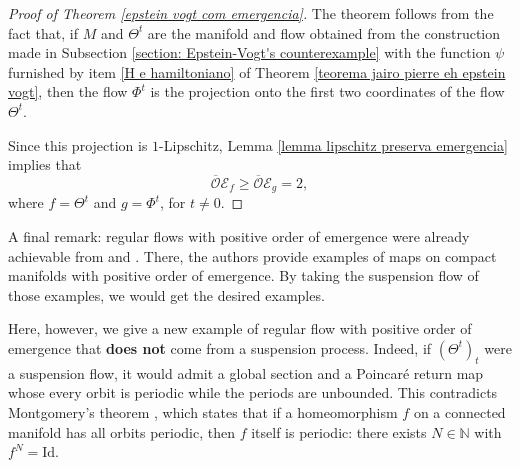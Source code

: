 \documentclass[11pt,reqno]{amsart}
\theoremstyle{plain}
\theoremstyle{definition}
\theoremstyle{remark}
\theoremstyle{plain}
\numberwithin{equation}{section}
\newcommand{\N}{\mathbb{N}}
\begin{document}
					
					\begin{proof}[Proof of Theorem \ref{epstein vogt com emergencia}]
						The theorem follows from the fact that, if $M$ and $\Theta^{t}$ are the manifold and flow obtained from the construction made in Subsection \ref{section: Epstein-Vogt's counterexample} with the function $\psi$ furnished by item \ref{H e hamiltoniano} of Theorem \ref{teorema jairo pierre eh epstein vogt}, then the flow $\Phi^{t}$ is the projection onto the first two coordinates of the flow $\Theta^{t}$. 
						
						Since this projection is $1$-Lipschitz, Lemma \ref{lemma lipschitz preserva emergencia} implies that $$\overline{\mathcal{O}}\mathcal{E}_{f}\geq \overline{\mathcal{O}}\mathcal{E}_{g}=2,$$ where $f=\Theta^{t}$ and $g=\Phi^{t}$, for $t\neq 0$.
					\end{proof}
					
					A final remark: regular flows with positive order of emergence were already achievable from \cite{bergerbochi} and \cite{berger22}. There, the authors provide examples of maps on compact manifolds with positive order of emergence. By taking the suspension flow of those examples, we would get the desired examples. 
					
					Here, however, we give a new example of regular flow with positive order of emergence that \textbf{does not} come from a suspension process. Indeed, if $(\Theta^t)_{t}$ were a suspension flow, it would admit a global section and a Poincaré return map whose every orbit is periodic while the periods are unbounded. This contradicts Montgomery's theorem \cite{montgomery}, which states that if a homeomorphism $f$ on a connected manifold has all orbits periodic, then $f$ itself is periodic: there exists $N\in\N$ with $f^N=\mathrm{Id}$.
					





\end{document}
